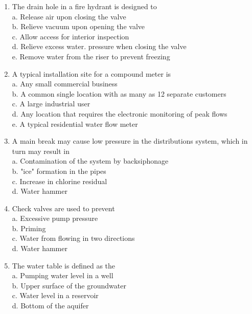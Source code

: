 \begin{enumerate}[1.]
\item The drain hole in a fire hydrant is designed to\\
a.	Release air upon closing the valve\\
b.	Relieve vacuum upon opening the valve\\
c.	Allow access for interior inspection\\
d.	Relieve excess water. pressure when closing the valve\\
e.	Remove water from the riser to prevent freezing\\

\item A typical installation site for a compound meter is\\
a.	Any small commercial business\\
b.	A common single location with as many as 12 separate customers\\
c.	A large industrial user\\
d.	Any location that requires the electronic monitoring of peak flows\\
e.	A typical residential water flow meter\\


  \item A main break may cause low pressure in the distributions system, which in turn may result in\\

a. Contamination of the system by backsiphonage\\

b. "ice" formation in the pipes\\

c. Increase in chlorine residual\\

d. Water hammer\\

\item Check valves are used to prevent\\

a. Excessive pump pressure\\

b. Priming\\

c. Water from flowing in two directions\\

d. Water hammer\\

\item The water table is defined as the\\
a. Pumping water level in a well\\
b. Upper surface of the groundwater\\
c. Water level in a reservoir\\
d. Bottom of the aquifer\\


\end{enumerate}

